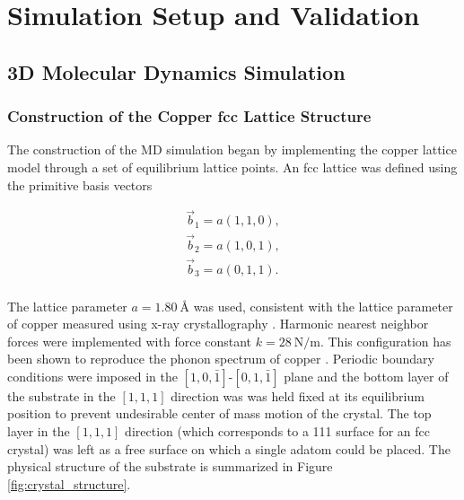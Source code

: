 \chapter{Simulation Setup and Validation} \label{ch:sim_setup} 

\section{3D Molecular Dynamics Simulation} \label{sec:md_setup}

\subsection{Construction of the Copper fcc Lattice Structure}

The construction of the MD simulation began by implementing the copper lattice model through a set of equilibrium lattice points. An fcc lattice was defined using the primitive basis vectors

\begin{align}
	\vec{b}_1 = a\left(1,1,0\right), \nonumber \\
	\vec{b}_2 = a\left(1,0,1\right), \label{eq:primitive_basis_vectors} \\
	\vec{b}_3 = a\left(0,1,1\right). \nonumber
\end{align}
\\
The lattice parameter $a=\SI{1.80}{\angstrom}$ was used, consistent with the lattice parameter of copper measured using x-ray crystallography \cite{davey}.
Harmonic nearest neighbor forces were implemented with force constant $k=\SI{28}{\newton\per\metre}$. This configuration has been shown to reproduce the phonon spectrum of copper \cite{sinha}. Periodic boundary conditions were imposed in the $\left[1,0,\bar{1}\right]$-$\left[0,1,\bar{1}\right]$ plane and the bottom layer of the substrate in the $\left[1,1,1\right]$ direction was was held fixed at its equilibrium position to prevent undesirable center of mass motion of the crystal. The top layer in the $\left[1,1,1\right]$ direction (which corresponds to a 111 surface for an fcc crystal) was left as a free surface on which a single adatom could be placed. The physical structure of the substrate is summarized in Figure \ref{fig:crystal_structure}.

